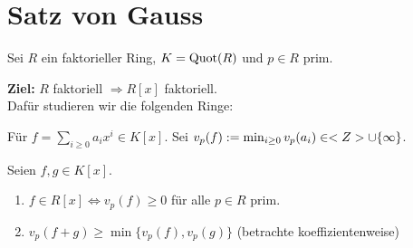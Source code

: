 \section{Satz von Gauss}
Sei $R$ ein faktorieller Ring, $K= \operatorname{Quot}(R)$ und $p \in R$ prim.

\begin{remark}
	\textbf{Ziel:} $R$ faktoriell $\Rightarrow R[x]$ faktoriell.\\
	Dafür studieren wir die folgenden Ringe:
	\begin{center}
	\end{center}
\end{remark}

\begin{definition}
	Für $f = \sum_{i \ge 0} a_i x^i \in K[x]$. Sei $v_p(f) := \min_{i \ge 0} v_p(a_i) \in <Z> \cup \{\infty\}$.
\end{definition}

\begin{remark}
	Seien $f,g \in K[x]$.
	\begin{enumerate}[label=(\alph*)]
		\item $f \in R[x] \Leftrightarrow v_p(f) \ge 0$ für alle $p \in R$ prim.
		\item $v_p(f+g) \ge \min\{v_p(f), v_p(g)\}$ (betrachte koeffizientenweise)
	\end{enumerate}
\end{remark}

